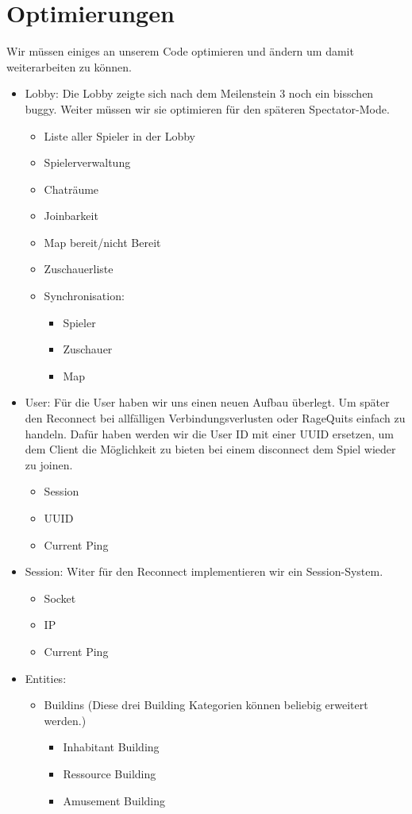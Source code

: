 \documentclass{scrartcl}
\newcommand{\n}{\newline}
\begin{document}
\section*{Optimierungen}
Wir müssen einiges an unserem Code optimieren und ändern um damit weiterarbeiten zu können.
\begin{itemize}
	\item Lobby: \n
	Die Lobby zeigte sich nach dem Meilenstein 3 noch ein bisschen buggy. Weiter müssen wir sie optimieren für den späteren Spectator-Mode.
	\begin{itemize}
		\item Liste aller Spieler in der Lobby
		\item Spielerverwaltung
		\item Chaträume
		\item Joinbarkeit
		\item Map bereit/nicht Bereit
		\item Zuschauerliste
		\item Synchronisation:
		\begin{itemize}
			\item Spieler
			\item Zuschauer
			\item Map
		\end{itemize}
	\end{itemize}
	\item User: \n 
	Für die User haben wir uns einen neuen Aufbau überlegt. Um später den Reconnect bei allfälligen Verbindungsverlusten oder RageQuits einfach zu handeln. Dafür haben werden wir die User ID mit einer UUID ersetzen, um dem Client die Möglichkeit zu bieten bei einem disconnect dem Spiel wieder zu joinen.
	\begin{itemize}
		\item Session
		\item UUID
		\item Current Ping
	\end{itemize}
	\item Session: \n
	Witer für den Reconnect implementieren wir ein Session-System.
	\begin{itemize}
		\item Socket
		\item IP
		\item Current Ping
	\end{itemize}
	\item Entities: \n
	\begin{itemize}
		\item Buildins (Diese drei Building Kategorien können beliebig erweitert werden.)
		\begin{itemize}
			\item Inhabitant Building
			\item Ressource Building
			\item Amusement Building
		\end{itemize}
	\end{itemize}
\end{itemize}
\end{document}
